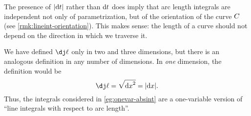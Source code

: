\documentclass[12pt]{amsart}
\begin{document}
\begin{rmk}
  The presence of $|{\mathrm{d} t}|$ rather than ${\mathrm{d} t}$ does imply that arc length integrals are independent not only of parametrization, but of the orientation of the curve $C$ (see \cref{rmk:lineint-orientation}).
  This makes sense: the length of a curve should not depend on the direction in which we traverse it.
\end{rmk}

\begin{rmk}
  We have defined $\dl$ only in two and three dimensions, but there is an analogous definition in any number of dimensions.
  In \emph{one} dimension, the definition would be
  \[ \dl = \sqrt{\dx^2} = |\dx|. \]
  Thus, the integrals considered in \cref{eg:onevar-absint} are a one-variable version of ``line integrals with respect to arc length''.
\end{rmk}
\end{document}

